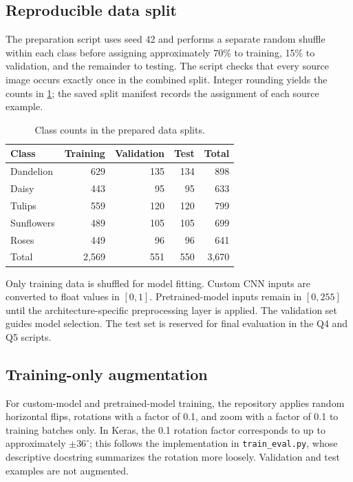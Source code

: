 \documentclass[11pt,a4paper]{article}
\newcommand{\class}[1]{\texttt{#1}}
\begin{document}
\subsection{Reproducible data split}
The preparation script uses seed 42 and performs a separate random shuffle
within each class before assigning approximately 70\% to training, 15\% to
validation, and the remainder to testing. The script checks that every source
image occurs exactly once in the combined split. Integer rounding yields the
counts in \cref{tab:split}; the saved split manifest records the assignment of
each source example.

\begin{table}[H]\centering
\caption{Class counts in the prepared data splits.}\label{tab:split}
\begin{tabular}{lrrrr}
\toprule
Class & Training & Validation & Test & Total \\
\midrule
Dandelion & 629 & 135 & 134 & 898 \\
Daisy & 443 & 95 & 95 & 633 \\
Tulips & 559 & 120 & 120 & 799 \\
Sunflowers & 489 & 105 & 105 & 699 \\
Roses & 449 & 96 & 96 & 641 \\
\midrule
Total & 2,569 & 551 & 550 & 3,670 \\
\bottomrule
\end{tabular}
\end{table}

Only training data is shuffled for model fitting. Custom CNN inputs are
converted to float values in $[0,1]$. Pretrained-model inputs remain in
$[0,255]$ until the architecture-specific preprocessing layer is applied.
The validation set guides model selection. The test set is reserved for final
evaluation in the Q4 and Q5 scripts.

\subsection{Training-only augmentation}
For custom-model and pretrained-model training, the repository applies random
horizontal flips, rotations with a factor of 0.1, and zoom with a factor of
0.1 to training batches only. In Keras, the 0.1 rotation factor corresponds to
up to approximately $\pm36^\circ$; this follows the implementation in
\class{train\_eval.py}, whose descriptive docstring summarizes the rotation
more loosely. Validation and test examples are not augmented.
\end{document}
